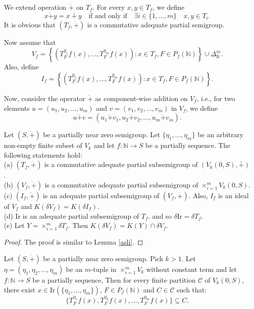 \documentclass[twoside,11pt]{article}
\begin{document}
We extend operation $\ddot{+}$ on $T_f$. For every $x,y \in T_f$, we define
\[
x \ddot{+} y = x \dotplus y \quad \text{if and only if} \quad \exists i \in \{1,\ldots,m\} \quad x,y \in T_i.
\]
It is obvious that $(T_f,\ddot{+})$ is a commutative adequate partial semigroup.

Now assume that   
\[
V_f = \left\{ \left( T_F^{\eta_1}f(x), \ldots, T_F^{\eta_m}f(x) \right) : x \in T_f, F \in P_f(\mathbb{N}) \right\} \cup \Delta_{\mathrm{Ir}}^m.
\]
Also, define 
\[
I_f = \left\{ \left( T_F^{\eta_1}f(x), \ldots, T_F^{\eta_m}f(x) \right) : x \in T_f, F \in P_f(\mathbb{N}) \right\}.
\]

Now, consider the operator $\ddot{+}$ as component-wise addition on $V_f$, i.e., for two elements $u = (u_1, u_2, \dots, u_m)$ and $v = (v_1, v_2, \dots, v_m)$ in $V_f$, we define
\[
u \ddot{+} v = (u_1 \ddot{+} v_1, u_2 \ddot{+} v_2, \dots, u_m \ddot{+} v_m).
\]

\begin{lemma} \label{asli_2}
	Let $(S,\dot{+})$ be a partially near zero semigroup. Let $\{\eta_1,\ldots,\eta_m\}$ be an arbitrary non-empty finite subset of $V_k$ and let $f:\mathbb{N}\to S$ be a partially sequence. The following statements hold:\\
	(a) $(T_f,\ddot{+})$ is a commutative adequate partial subsemigroup of $(V_k(0,S),\dotplus)$.\\
	(b) $(V_f,\ddot{+})$ is a commutative adequate partial subsemigroup of $\times_{i=1}^m V_k(0,S)$.\\
	(c) $(I_f,\ddot{+})$ is an adequate partial subsemigroup of $(V_f,\ddot{+})$. Also, $I_f$ is an ideal of $V_f$ and $K(\delta V_f) = K(\delta I_f)$.\\
	(d) $\mathrm{Ir}$ is an adequate partial subsemigroup of $T_f$. and so $\delta \mathrm{Ir} = \delta T_f$.\\
	(e) Let $Y = \times_{i=1}^m \delta T_f$. Then $K(\delta V_f) = K(Y) \cap \delta V_f$.
\end{lemma}
\begin{proof}
	The proof is similar to Lemma \ref{asli}.
\end{proof}

\begin{theorem} \label{5.9}
	Let $(S,\dot{+})$ be a partially near zero semigroup. Pick $k>1$. Let \( \eta = (\eta_1, \eta_2, \ldots, \eta_m) \) be an $m$-tuple in $\times_{i=1}^m V_k$ without constant term and let $f:\mathbb{N}\to S$ be a partially sequence, Then for every finite partition $\mathcal{C}$ of $V_k(0,S)$, there exist $x \in \mathrm{Ir}(\{\eta_1,\ldots,\eta_m\})$, $F \in P_f(\mathbb{N})$ and $C \in \mathcal{C}$ such that:
	\[
	\{ T_F^{\eta_1}f(x), T_F^{\eta_2}f(x), \ldots, T_F^{\eta_m}f(x) \} \subseteq C.
	\]
\end{theorem}
\end{document}

